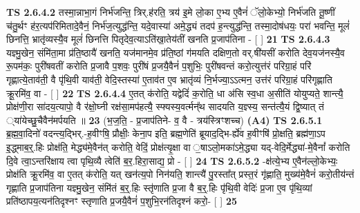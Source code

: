 \documentclass[17pt]{extarticle}
\begin{document}
                                \textbf{ TS 2.6.4.2} \newline
                  तस्मा॒न्नाभा॒गं निर्भ॑जन्ति॒ त्रिर्.ह॑रति॒ त्रय॑ इ॒मे लो॒का ए॒भ्य ए॒वैनं॑ ॅलो॒केभ्यो॒ निर्भ॑जति तू॒ष्णीं च॑तु॒र्थꣳ ह॑र॒त्यप॑रिमितादे॒वैनं॒ निर्भ॑ज॒त्युद्ध॑न्ति॒ यदे॒वास्या॑ अमे॒द्ध्यं तदप॑ ह॒न्त्युद्ध॑न्ति॒ तस्मा॒दोष॑धयः॒ परा॑ भवन्ति॒ मूलं॑ छिनत्ति॒ भ्रातृ॑व्यस्यै॒व मूलं॑ छिनत्ति पितृदेव॒त्याऽति॑खा॒तेय॑तीं खनति प्र॒जाप॑तिना - [  ] \textbf{  21} \newline
                  \newline
                                \textbf{ TS 2.6.4.3} \newline
                  यज्ञ्मु॒खेन॒ संमि॑ता॒मा प्र॑ति॒ष्ठायै॑ खनति॒ यज॑मानमे॒व प्र॑ति॒ष्ठां ग॑मयति दक्षिण॒तो वर्.षी॑यसीं करोति देव॒यज॑नस्यै॒व रू॒पम॑कः॒ पुरी॑षवतीं करोति प्र॒जावै प॒शवः॒ पुरी॑षं प्र॒जयै॒वैनं॑ प॒शुभिः॒ पुरी॑षवन्तं करो॒त्युत्त॑रं परिग्रा॒हं परि॑ गृह्णात्ये॒ताव॑ती॒ वै पृ॑थि॒वी याव॑ती॒ वेदि॒स्तस्या॑ ए॒ताव॑त ए॒व भ्रातृ॑व्यं नि॒र्भज्या॒ऽऽत्मन॒ उत्त॑रं परिग्रा॒हं परि॑गृह्णाति क्रू॒रमि॑व॒ वा - [  ] \textbf{  22} \newline
                  \newline
                                \textbf{ TS 2.6.4.4} \newline
                  ए॒तत् क॑रोति॒ यद्वेदिं॑ क॒रोति॒ धा अ॑सि स्व॒धा अ॒सीति॑ योयुप्यते॒ शान्त्यै॒ प्रोक्ष॑णी॒रा सा॑दय॒त्यापो॒ वै र॑क्षो॒घ्नी रक्ष॑सा॒मप॑हत्यै॒ स्फ्यस्य॒वर्त्मन्᳚थ सादयति य॒ज्ञ्स्य॒ सन्त॑त्यै॒यं द्वि॒ष्यात् तं \ध्या॑येच्छु॒चैवैन॑मर्पयति ॥ \textbf{  23} \newline
                  \newline
                      (भ॒ज॒ति॒ - प्र॒जाप॑तिने- व॒ वै - त्रय॑स्त्रिꣳशच्च)  \textbf{(A4)} \newline \newline
                                        \textbf{ TS 2.6.5.1} \newline
                  ब्र॒ह्म॒वा॒दिनो॑ वदन्त्य॒द्भिर्.-ह॒वीꣳषि॒ प्रौक्षीः॒ केना॒प इति॒ ब्रह्म॒णेति॑ ब्रूयाद॒द्भि-र्ह्ये॑व ह॒वीꣳषि॑ प्रो॒क्षति॒ ब्रह्म॑णा॒ऽप इ॒द्ध्माब॒र्॒.हिः प्रोक्ष॑ति॒ मेद्ध्य॑मे॒वैन॑त् करोति॒ वेदिं॒ प्रोक्ष॑त्यृ॒क्षा वा ॒षाऽलो॒मका॑ऽमे॒द्ध्या यद्-वेदि॒र्मेद्ध्या॑-मे॒वैनां᳚ करोति दि॒वे त्वा॒ऽन्तरि॑क्षाय त्वा पृथि॒व्यै त्वेति॑ ब॒र॒.हिरा॒साद्य॒ प्रो - [  ] \textbf{  24} \newline
                  \newline
                                \textbf{ TS 2.6.5.2} \newline
                  -क्ष॑त्ये॒भ्य ए॒वैन॑ल्लो॒केभ्यः॒ प्रोक्ष॑ति क्रू॒रमि॑व॒ वा ए॒तत् क॑रोति॒ यत् खन॑त्य॒पो निन॑यति॒ शान्त्यै॑ पु॒रस्ता᳚त् प्रस्त॒रं गृ॑ह्णाति॒ मुख्य॑मे॒वैनं॑ करो॒तीय॑न्तं गृह्णाति प्र॒जाप॑तिना यज्ञ्मु॒खेन॒ संमि॑तं ब॒र्॒.हिः स्तृ॑णाति प्र॒जा वै ब॒र्॒.हिः पृ॑थि॒वी वेदिः॑ प्र॒जा ए॒व पृ॑थि॒व्यां प्रति॑ष्ठापय॒त्यन॑तिदृश्नꣳ स्तृणाति प्र॒जयै॒वैनं॑ प॒शुभि॒रन॑तिदृश्नं करो॒- [  ] \textbf{  25} \newline
\end{document}
